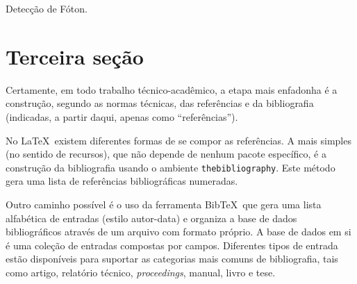 \documentclass[a4paper,12pt,oneside,onecolumn]{uerj}
\newcommand{\BibTeX}{{{Bib}}\TeX}
\begin{document}
\begin{algorithm*}[!ht]
    \caption{Detecção de Fóton.}
    \begin{pseudocode*}
        \Continuacao
        \Algoritmo{}
                \FimSe
            \Senao
            \FimSe
        \Senao
        \FimSe
        \FimAlgoritmo
      \FimDocumentacao
    \end{pseudocode*}
\end{algorithm*}

\section{Terceira seção}

Certamente, em todo trabalho técnico-acadêmico, a etapa mais enfadonha é a construção, segundo as normas técnicas, das referências e da bibliografia (indicadas, a partir daqui, apenas como ``referências'').

No \LaTeX\ existem diferentes formas de se compor as referências. A mais simples (no sentido de recursos), que não depende de nenhum pacote específico, é a construção da bibliografia usando o ambiente \texttt{thebiblio\-graphy}. Este método gera uma lista de referências bibliográficas numeradas.

Outro caminho possível é o uso da ferramenta \BibTeX\ que gera uma lista alfabética de entradas (estilo autor-data) e organiza a base de dados bibliográficos através de um arquivo com formato próprio. A base de dados em si é uma coleção de entradas compostas por campos. Diferentes tipos de entrada estão disponíveis para suportar as categorias mais comuns de bibliografia, tais como artigo, relatório técnico, \textsl{proceedings}, manual, livro e tese. 
\end{document}
